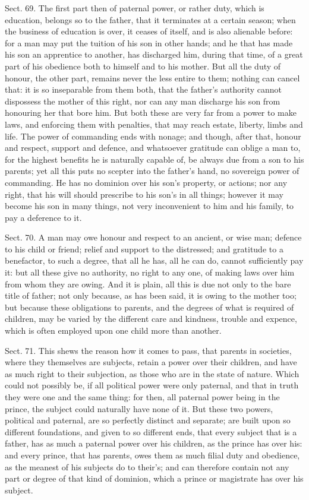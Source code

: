 \documentclass[11pt,openany]{book}
\begin{document}
Sect. 69. The first part then of paternal power, or rather duty, which is education, belongs so to the father, that it terminates at a certain season; when the business of education is over, it ceases of itself, and is also alienable before: for a man may put the tuition of his son in other hands; and he that has made his son an apprentice to another, has discharged him, during that time, of a great part of his obedience both to himself and to his mother. But all the duty of honour, the other part, remains never the less entire to them; nothing can cancel that: it is so inseparable from them both, that the father's authority cannot dispossess the mother of this right, nor can any man discharge his son from honouring her that bore him. But both these are very far from a power to make laws, and enforcing them with penalties, that may reach estate, liberty, limbs and life. The power of commanding ends with nonage; and though, after that, honour and respect, support and defence, and whatsoever gratitude can oblige a man to, for the highest benefits he is naturally capable of, be always due from a son to his parents; yet all this puts no scepter into the father's hand, no sovereign power of commanding. He has no dominion over his son's property, or actions; nor any right, that his will should prescribe to his son's in all things; however it may become his son in many things, not very inconvenient to him and his family, to pay a deference to it.

Sect. 70. A man may owe honour and respect to an ancient, or wise man; defence to his child or friend; relief and support to the distressed; and gratitude to a benefactor, to such a degree, that all he has, all he can do, cannot sufficiently pay it: but all these give no authority, no right to any one, of making laws over him from whom they are owing. And it is plain, all this is due not only to the bare title of father; not only because, as has been said, it is owing to the mother too; but because these obligations to parents, and the degrees of what is required of children, may be varied by the different care and kindness, trouble and expence, which is often employed upon one child more than another.

Sect. 71. This shews the reason how it comes to pass, that parents in societies, where they themselves are subjects, retain a power over their children, and have as much right to their subjection, as those who are in the state of nature. Which could not possibly be, if all political power were only paternal, and that in truth they were one and the same thing: for then, all paternal power being in the prince, the subject could naturally have none of it. But these two powers, political and paternal, are so perfectly distinct and separate; are built upon so different foundations, and given to so different ends, that every subject that is a father, has as much a paternal power over his children, as the prince has over his: and every prince, that has parents, owes them as much filial duty and obedience, as the meanest of his subjects do to their's; and can therefore contain not any part or degree of that kind of dominion, which a prince or magistrate has over his subject.
\end{document}
